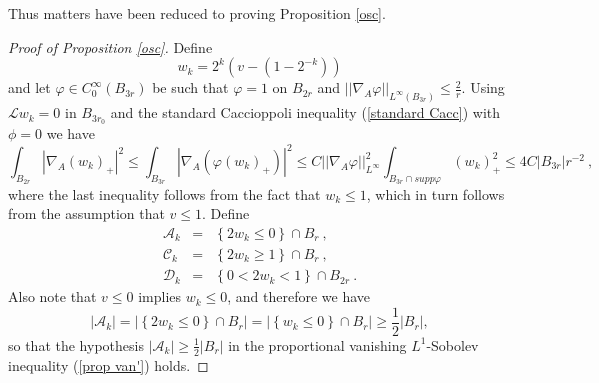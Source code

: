 \documentclass{amsart}
\theoremstyle{plain}
\numberwithin{equation}{section}
\begin{document}
Thus matters have been reduced to proving Proposition \ref{osc}.

\begin{proof}[Proof of Proposition \protect\ref{osc}]
	Define 
	\begin{equation*}
	w_{k}=2^{k}\left( v-(1-2^{-k})\right)
	\end{equation*}%
	and let $\varphi \in C_{0}^{\infty }(B_{3r})$ be such that $\varphi =1$ on $%
	B_{2r}$ and $||\nabla _{A}\varphi ||_{L^{\infty }(B_{3r})}\leq \frac{2}{r}$.
	Using $\mathcal{L}w_{k}=0$ in $B_{3r_{0}}$ and the standard Caccioppoli
	inequality (\ref{standard Cacc}) with $\phi =0$ we have 
	\begin{equation*}
	\int_{B_{2r}}|\nabla _{A}(w_{k})_{+}|^{2}\leq \int_{B_{3r}}|\nabla
	_{A}(\varphi (w_{k})_{+})|^{2}\leq C||\nabla _{A}\varphi ||_{L^{\infty
	}}^{2}\int_{B_{3r}\cap supp\varphi }(w_{k})_{+}^{2}\leq 4C\left\vert
	B_{3r}\right\vert r^{-2}\ ,
	\end{equation*}%
	where the last inequality follows from the fact that $w_{k}\leq 1$, which in
	turn follows from the assumption that $v\leq 1$. Define%
	\begin{eqnarray*}
		\mathcal{A}_{k} &=&\left\{ 2w_{k}\leq 0\right\} \cap B_{r}\ , \\
		\mathcal{C}_{k} &=&\left\{ 2w_{k}\geq 1\right\} \cap B_{r}\ , \\
		\mathcal{D}_{k} &=&\left\{ 0<2w_{k}<1\right\} \cap B_{2r}\ .
	\end{eqnarray*}%
	Also note that $v\leq 0$ implies $w_{k}\leq 0$, and therefore we have 
	\begin{equation}
	\left\vert \mathcal{A}_{k}\right\vert =\left\vert \left\{ 2w_{k}\leq
	0\right\} \cap B_{r}\right\vert =\left\vert \left\{ w_{k}\leq 0\right\} \cap
	B_{r}\right\vert \geq \frac{1}{2}\left\vert B_{r}\right\vert ,  \label{A}
	\end{equation}%
	so that the hypothesis $\left\vert \mathcal{A}_{k}\right\vert \geq \frac{1}{2%
	}\left\vert B_{r}\right\vert $ in the proportional vanishing $L^{1}$-Sobolev
	inequality (\ref{prop van'}) holds.
	

\end{proof}
\end{document}
